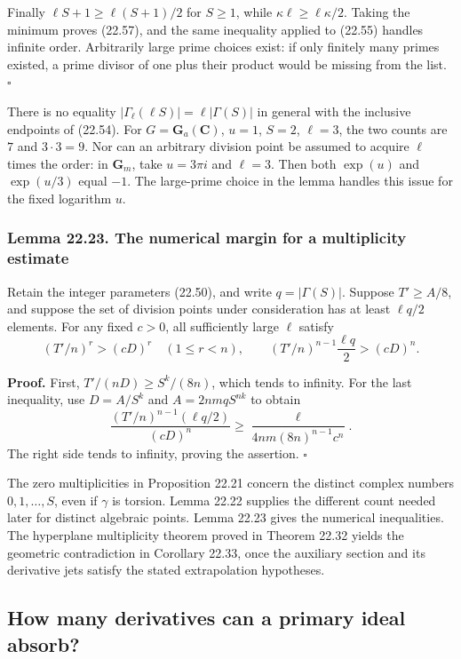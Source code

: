 \documentclass[
  11pt,
  a4paper,
]{article}
\begin{document}
Finally \(\ell S+1\ge\ell(S+1)/2\) for \(S\ge1\), while
\(\kappa\ell\ge\ell\kappa/2\). Taking the minimum proves (22.57), and
the same inequality applied to (22.55) handles infinite order.
Arbitrarily large prime choices exist: if only finitely many primes
existed, a prime divisor of one plus their product would be missing from
the list. \(\square\)

There is no equality \(|\Gamma_\ell(\ell S)|=\ell|\Gamma(S)|\) in
general with the inclusive endpoints of (22.54). For
\(G=\mathbf G_a(\mathbf C)\), \(u=1\), \(S=2\), \(\ell=3\), the two
counts are \(7\) and \(3\cdot3=9\). Nor can an arbitrary division point
be assumed to acquire \(\ell\) times the order: in \(\mathbf G_m\), take
\(u=3\pi i\) and \(\ell=3\). Then both \(\exp(u)\) and \(\exp(u/3)\)
equal \(-1\). The large-prime choice in the lemma handles this issue for
the fixed logarithm \(u\).

\subsubsection{Lemma 22.23. The numerical margin for a multiplicity
estimate}\label{lemma-22.23.-the-numerical-margin-for-a-multiplicity-estimate}

Retain the integer parameters (22.50), and write \(q=|\Gamma(S)|\).
Suppose \(T'\ge A/8\), and suppose the set of division points under
consideration has at least \(\ell q/2\) elements. For any fixed \(c>0\),
all sufficiently large \(\ell\) satisfy \[
 (T'/n)^r>(cD)^r\quad(1\le r<n),\qquad
 (T'/n)^{n-1}\frac{\ell q}2>(cD)^n.
 \tag{22.58}
\]

\textbf{Proof.} First, \(T'/(nD)\ge S^k/(8n)\), which tends to infinity.
For the last inequality, use \(D=A/S^k\) and \(A=2nmqS^{nk}\) to obtain
\[
 \frac{(T'/n)^{n-1}(\ell q/2)}{(cD)^n}
 \ge\frac{\ell}{4nm(8n)^{n-1}c^n}.
 \tag{22.59}
\] The right side tends to infinity, proving the assertion. \(\square\)

The zero multiplicities in Proposition 22.21 concern the distinct
complex numbers \(0,1,\ldots,S\), even if \(\gamma\) is torsion. Lemma
22.22 supplies the different count needed later for distinct algebraic
points. Lemma 22.23 gives the numerical inequalities. The hyperplane
multiplicity theorem proved in Theorem 22.32 yields the geometric
contradiction in Corollary 22.33, once the auxiliary section and its
derivative jets satisfy the stated extrapolation hypotheses.

\subsection{How many derivatives can a primary ideal
absorb?}\label{how-many-derivatives-can-a-primary-ideal-absorb}
\end{document}
